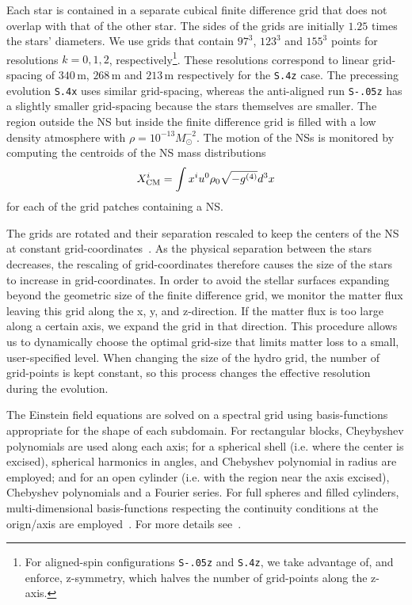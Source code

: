 {Each star is contained in a separate cubical finite
difference grid that does not overlap with that
of the other star.  The sides of the grids are initially $1.25$ times
the stars' diameters. We use grids that contain $97^3$, $123^3$ and
$155^3$ points for resolutions $k=0,1,2$, respectively\footnote{For
  aligned-spin configurations {\tt S-.05z} and {\tt S.4z}, we take advantage of,
  and enforce, z-symmetry, which halves the number of grid-points
  along the z-axis.}.  These resolutions correspond to linear
grid-spacing of $340\,\text{m}$, $268\,\text{m}$ and $213\,\text{m}$
respectively for the {\tt S.4z} case.  The precessing evolution {\tt S.4x} uses
similar grid-spacing, whereas the anti-aligned run {\tt S-.05z} has a
slightly smaller grid-spacing because the stars themselves are
smaller. The region outside the NS but inside the finite
difference grid is filled with a low density
atmosphere with $\rho=10^{-13}M_{\odot}^{-2}$.  The motion of the NSs
is monitored by computing the centroids of the NS mass distributions
\begin{equation}
\label{eq:centroid}
X^i_{\rm CM} = \int{x^iu^0\rho_0\sqrt{-g^{(4)}}d^3x}
\end{equation}
for each of the grid patches containing a NS.

The grids are rotated and their separation rescaled to keep the
centers of the NS at constant grid-coordinates~\cite{Scheel2006,Hemberger:2012jz,Scheel2014}.  As the physical separation between the stars decreases, the rescaling of
grid-coordinates therefore causes the size of the stars to increase
in grid-coordinates.  In order to avoid the stellar surfaces expanding
beyond the geometric size of the finite difference grid, we monitor the matter flux leaving
this grid along the x, y, and z-direction.  If the matter flux is too
large along a certain axis, we expand the grid in that
direction.  
This procedure allows us to
dynamically choose the optimal grid-size that limits matter loss to a
small, user-specified level.  When changing the size of the hydro
grid, the number of grid-points is kept constant, so this process
changes the effective resolution during the evolution.

The Einstein field equations are solved on a spectral grid using basis-functions appropriate for the shape of each subdomain.
For rectangular blocks, Cheybyshev polynomials are used along each axis; for a spherical shell (i.e. where the center is excised), spherical harmonics in angles, and Chebyshev polynomial in radius are employed; and for an open cylinder (i.e. with the region near the axis excised), Chebyshev polynomials and a Fourier series.  For full spheres and filled cylinders, multi-dimensional basis-functions respecting the continuity conditions at the orign/axis are employed~\cite{Matsushima-Marcus:1995,1997JCoPh.136..100V}.  For more details see~\cite{Muhlberger2014}. 


}
